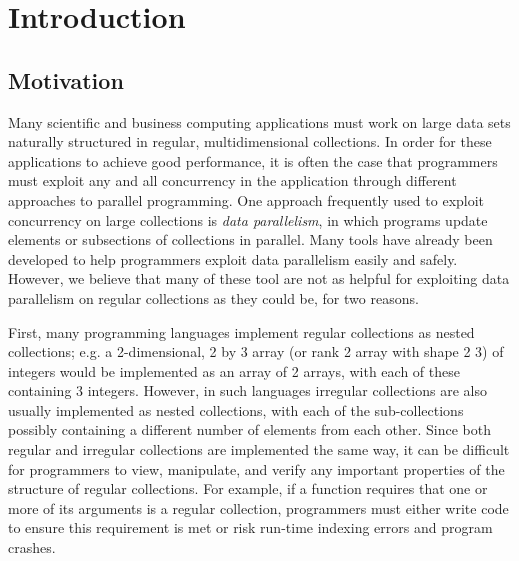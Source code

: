 \chapter{Introduction}

\section{Motivation}
Many scientific and business computing applications must work on large data sets naturally structured in regular, multidimensional collections.
In order for these applications to achieve good %
performance, it is often the case that programmers must exploit any and all concurrency %
in the application through different approaches to parallel programming.
One approach frequently used to exploit concurrency on large collections is \textit{data parallelism}, in which programs update elements or subsections of collections in parallel.
Many tools have already been developed to help programmers exploit data parallelism easily and safely. %
However, we believe that many of these tool are %
not as helpful for exploiting data parallelism on regular collections as they could be, %
for two reasons.

First, many programming languages implement regular collections as nested collections;
e.g. a 2-dimensional, 2 by 3 array (or rank 2 array with shape 2 3) of integers would be implemented as 
an array of 2 arrays, with each of these containing 3 integers. %
However, in such languages irregular collections are also usually implemented as nested collections, 
with each of the sub-collections possibly containing a different number of elements from each other.
Since both regular and irregular collections are implemented the same way,
it can be difficult for programmers to view, manipulate, and verify any important properties of the structure of regular collections.
For example, if a function requires that one or more of its arguments is a regular collection, 
programmers must either write code to ensure this requirement is met %
or risk run-time indexing errors and program crashes.

